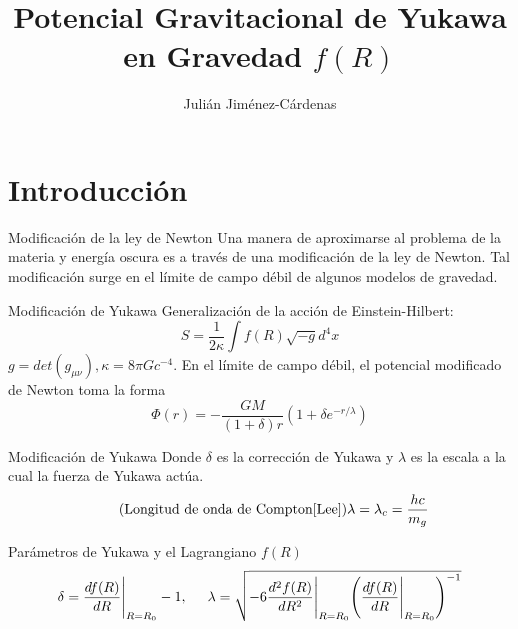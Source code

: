 \documentclass{beamer}
\title[Potencial Gravitacional de Yukawa en Gravedad $f(R)$]{Potencial Gravitacional de Yukawa en Gravedad $f(R)$}
\author[Julián Jiménez-Cárdenas]{Julián Jiménez-Cárdenas}
\institute{Universidad Nacional de Colombia, Bogotá. \and \texttt{juojimenezca@unal.edu.co}}
\date{}
\begin{document}
\justifying
	\frame{\titlepage}
	\frame[allowframebreaks]{\tableofcontents}
	\section{Introducción}
	\begin{frame}{Modificación de la ley de Newton}
		Una manera de aproximarse al problema de la materia y energía oscura es a través de una modificación de la ley de Newton. Tal modificación surge en el límite de campo débil de algunos modelos de gravedad.
		
		\begin{block}{Modificación de Yukawa}
						Generalización de la acción de Einstein-Hilbert:
			\begin{equation}
				S=\frac{1}{2\kappa}\int f(R)\sqrt{-g}d^4x
			\end{equation}
			$g=det(g_{\mu\nu}), \kappa=8\pi Gc^{-4}$. En el límite de campo débil, el potencial modificado de Newton toma la forma\cite{Capozziello}
			\begin{equation}
				\Phi (r)=-\frac{GM}{(1+\delta)r}(1+\delta e^{-r/\lambda})
			\end{equation}			
		\end{block}
	\end{frame}
	
	\begin{frame}{Modificación de Yukawa}
		Donde $\delta$ es la corrección de Yukawa y $\lambda$ es la escala a la cual la fuerza de Yukawa actúa.
		\begin{equation}\tag{Longitud de onda de Compton\cite{Lee}}
			\lambda=\lambda_c=\frac{hc}{m_g}
		\end{equation}
		
		\begin{block}{Parámetros de Yukawa y el Lagrangiano $f(R)$ \cite{Capozziello2}}
		\begin{equation*}
		\delta=\frac{df(R)}{dR}\Bigg|_{R=R_0}-1, \hspace{0.5cm} \lambda=\sqrt{-6\frac{d^2f(R)}{dR^2}\Bigg|_{R=R_0}\Bigg( \frac{df(R)}{dR}\Bigg|_{R=R_0} \Bigg)^{-1}}
		\end{equation*}
		
		\end{block}
	\end{frame}
	
\end{document}
